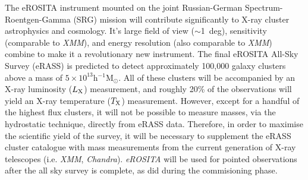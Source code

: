 \documentclass[fleqn,usenatbib]{mnras}
\begin{document}
The eROSITA instrument mounted on the joint Russian-German Spectrum-Roentgen-Gamma (SRG) mission will contribute significantly to X-ray cluster astrophysics and cosmology. It's large field of view (${\sim}$1~deg), sensitivity (comparable to {\em XMM}), and energy resolution (also comparable to {\em XMM}) combine to make it a revolutionary new instrument. The final eROSITA All-Sky Survey (eRASS) is predicted to detect approximately 100,000 galaxy clusters above a mass of $5\times10^{13}$h$^{-1}$M$_{\odot}$. All of these clusters will be accompanied by an X-ray luminosity ($L_{\rm X}$) measurement, and roughly 20\% \citep[][]{efedsclustercat} of the observations will yield an X-ray temperature ($T_{\rm X}$) measurement. However, except for a handful of the highest flux clusters, it will not be  possible to measure masses, via the hydrostatic technique, directly from eRASS data. Therefore, in order to maximise the scientific yield of the survey, it will be necessary to supplement the eRASS cluster catalogue with mass measurements from the current generation of X-ray telescopes (i.e. {\em XMM}, {\em Chandra}). {\em eROSITA} will be used for pointed observations after the all sky survey is complete, as \cite{pointysanders} did during the commisioning phase.
\end{document}
